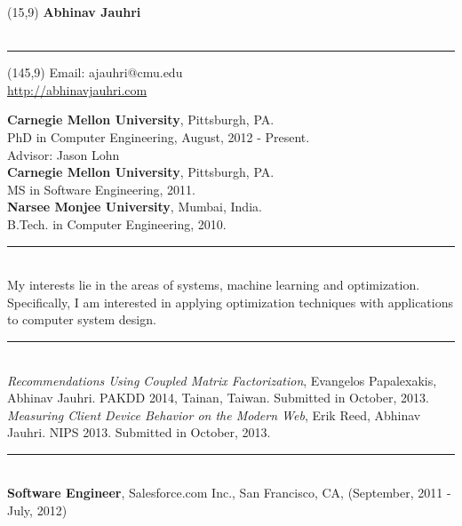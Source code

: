 \documentclass[a4paper,oneside,english]{article}
\begin{document}

\begin{textblock}{50}(15,9)
	\noindent \textbf{\huge Abhinav Jauhri}  \\ \\
        \rule{7in}{0.4pt}
\end{textblock}

\begin{textblock}{50}(145,9)
	\noindent Email: ajauhri@cmu.edu  \\
	\noindent \url{http://abhinavjauhri.com} \\
\end{textblock}

\reversemarginpar
{} 
\noindent \textbf{Carnegie Mellon University}, Pittsburgh, PA.  \\ PhD in Computer Engineering, August, 2012 - Present. \\ Advisor: Jason Lohn  \vspace*{2mm} \\
\textbf{Carnegie Mellon University}, Pittsburgh, PA. \\ MS in Software Engineering, 2011. \vspace*{2mm} \\
\textbf{Narsee Monjee University}, Mumbai, India. \\ B.Tech. in Computer Engineering, 2010. \\
\noindent\rule{6in}{0.4pt}  \\[4pt]
\noindent My interests lie in the areas of systems, machine learning and optimization. Specifically, I am interested in applying optimization techniques with applications to computer system design. \\
\noindent\rule{6in}{0.4pt} \\[4pt]
\textit{Recommendations Using Coupled Matrix Factorization}, Evangelos Papalexakis, Abhinav Jauhri. PAKDD 2014, Tainan, Taiwan. Submitted in October, 2013. \vspace*{2mm} \\
\textit{Measuring Client Device Behavior on the Modern Web}, Erik Reed, Abhinav Jauhri. NIPS 2013. Submitted in October, 2013. \\
\textit{ }
\noindent\rule{6in}{0.4pt} \\[4pt]
 \textbf{Software Engineer}, Salesforce.com Inc., San Francisco, CA, (September, 2011 - July, 2012)
\end{document}
